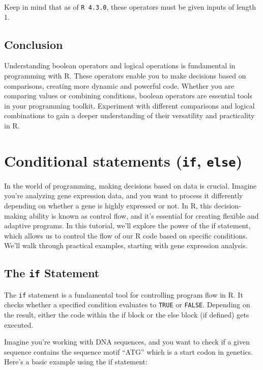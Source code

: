 \documentclass[
]{book}
\begin{document}
Keep in mind that as of \texttt{R\ 4.3.0}, these operators must be given inputs of length 1.

\hypertarget{conclusion-5}{%
\subsection{Conclusion}\label{conclusion-5}}

Understanding boolean operators and logical operations is fundamental in programming with R. These operators enable you to make decisions based on comparisons, creating more dynamic and powerful code. Whether you are comparing values or combining conditions, boolean operators are essential tools in your programming toolkit. Experiment with different comparisons and logical combinations to gain a deeper understanding of their versatility and practicality in R.

\hypertarget{conditional-statements-if-else}{%
\section{\texorpdfstring{Conditional statements (\texttt{if}, \texttt{else})}{Conditional statements (if, else)}}\label{conditional-statements-if-else}}

In the world of programming, making decisions based on data is crucial. Imagine you're analyzing gene expression data, and you want to process it differently depending on whether a gene is highly expressed or not. In R, this decision-making ability is known as control flow, and it's essential for creating flexible and adaptive programs. In this tutorial, we'll explore the power of the if statement, which allows us to control the flow of our R code based on specific conditions. We'll walk through practical examples, starting with gene expression analysis.

\hypertarget{the-if-statement}{%
\subsection{\texorpdfstring{The \texttt{if} Statement}{The if Statement}}\label{the-if-statement}}

The \texttt{if} statement is a fundamental tool for controlling program flow in R. It checks whether a specified condition evaluates to \texttt{TRUE} or \texttt{FALSE}. Depending on the result, either the code within the if block or the else block (if defined) gets executed.

Imagine you're working with DNA sequences, and you want to check if a given sequence contains the sequence motif ``ATG'' which is a start codon in genetics. Here's a basic example using the if statement:
\end{document}
